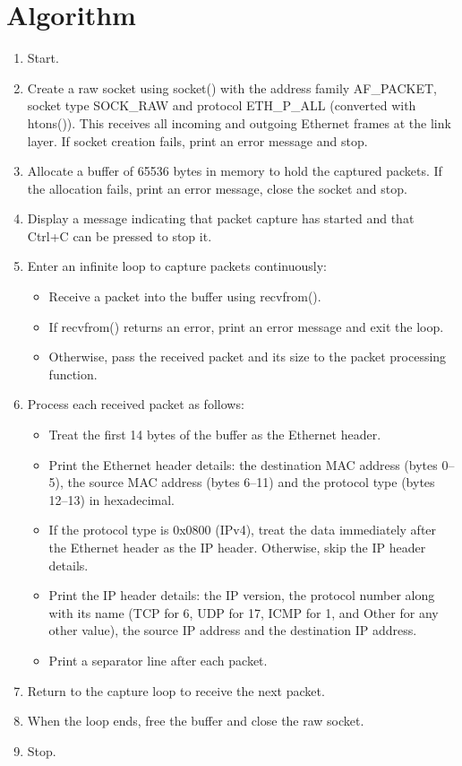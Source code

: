 \documentclass[12pt, a4paper]{report}
\begin{document}
\section*{Algorithm}
\begin{enumerate}
	\item Start.
	\item Create a raw socket using socket() with the address family AF\_PACKET, socket type SOCK\_RAW and protocol ETH\_P\_ALL (converted with htons()). This receives all incoming and outgoing Ethernet frames at the link layer. If socket creation fails, print an error message and stop.
	\item Allocate a buffer of 65536 bytes in memory to hold the captured packets. If the allocation fails, print an error message, close the socket and stop.
	\item Display a message indicating that packet capture has started and that Ctrl+C can be pressed to stop it.
	\item Enter an infinite loop to capture packets continuously:
	\begin{itemize}
		\item Receive a packet into the buffer using recvfrom().
		\item If recvfrom() returns an error, print an error message and exit the loop.
		\item Otherwise, pass the received packet and its size to the packet processing function.
	\end{itemize}
	\item Process each received packet as follows:
	\begin{itemize}
		\item Treat the first 14 bytes of the buffer as the Ethernet header.
		\item Print the Ethernet header details: the destination MAC address (bytes 0--5), the source MAC address (bytes 6--11) and the protocol type (bytes 12--13) in hexadecimal.
		\item If the protocol type is 0x0800 (IPv4), treat the data immediately after the Ethernet header as the IP header. Otherwise, skip the IP header details.
		\item Print the IP header details: the IP version, the protocol number along with its name (TCP for 6, UDP for 17, ICMP for 1, and Other for any other value), the source IP address and the destination IP address.
		\item Print a separator line after each packet.
	\end{itemize}
	\item Return to the capture loop to receive the next packet.
	\item When the loop ends, free the buffer and close the raw socket.
	\item Stop.
\end{enumerate}
\vspace{-0.9cm}
\end{document}
